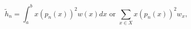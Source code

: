 \[\tilde{h}_{n}=\int_{a}^{b}x\left(p_{n}(x)\right)^{2}w(x)dx\text{ or }\sum_{x%
\in X}x\left(p_{n}(x)\right)^{2}w_{x},\]